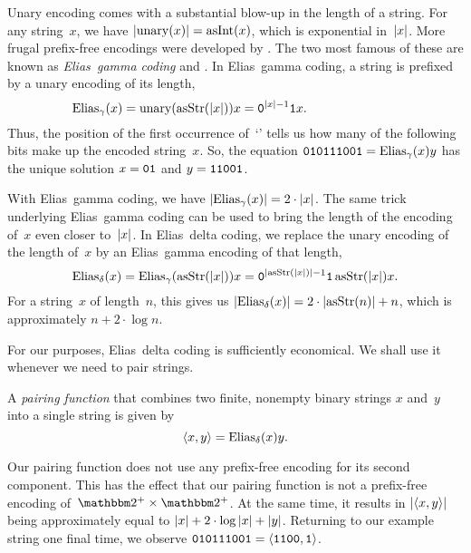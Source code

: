 Unary encoding comes with a substantial blow-up in the length of a string.
For any string~$x$, we have ${\lvert\operatorname{unary}(x)\rvert} = \operatorname{asInt}(x)$, which is exponential in~${\lvert x\rvert}$.
More frugal prefix-free encodings were developed by \textcite{elias1975universal}.
The two most famous of these are known as \emph{Elias~gamma coding} and  \parencite[see also][]{sayood2017introduction}.
In Elias~gamma coding, a string is prefixed by a unary encoding of its length,
\begin{equation*}
  \mathrlap{
    \Elias_\gamma(x) \deq \unary(\asStr(\length{x})) x = \bits{0}^{\length{x} - 1} \bits{1} x.
  }\phantom{
    \Elias_\delta(x) \deq \Elias_\gamma(\asStr(\length{x})) x = \bits{0}^{\length{\asStr(\length{x})} - 1} \bits{1} \asStr(\length{x}) x.
  }
\end{equation*}
Thus, the position of the first occurrence of~`' tells us how many of the following bits make up the encoded string~$x$.
So, the equation $\textnormal{\texttt{010111001}} = \operatorname{Elias}_\gamma(x)y$ has the unique solution $x = \textnormal{\texttt{01}}$ and $y = \textnormal{\texttt{11001}}$.

With Elias~gamma coding, we have ${\lvert\operatorname{Elias}_\gamma(x)\rvert} = 2 \cdot {\lvert x\rvert}$.
The same trick underlying Elias~gamma coding can be used to bring the length of the encoding of~$x$ even closer to~${\lvert x\rvert}$.
In Elias~delta coding, we replace the unary encoding of the length of~$x$ by an Elias~gamma encoding of that length,
\begin{equation*}
  \operatorname{Elias}_\delta(x) = \operatorname{Elias}_\gamma(\operatorname{asStr}({\lvert x\rvert})) x = \textnormal{\texttt{0}}^{{\lvert\operatorname{asStr}({\lvert x\rvert})\rvert} - 1} \textnormal{\texttt{1}} \operatorname{asStr}({\lvert x\rvert}) x.
\end{equation*}
For a string~$x$ of length~$n$, this gives us ${\lvert\operatorname{Elias}_\delta(x)\rvert} = 2 \cdot {\lvert\operatorname{asStr}(n)\rvert} + n$, which is approximately $n + 2 \cdot \log n$.

For our purposes, Elias~delta coding is sufficiently economical.
We shall use it whenever we need to pair strings.
\begin{definition}
  A \emph{pairing function} that combines two finite, nonempty binary strings $x$ and~$y$ into a single string is given by
  \begin{equation*}
    {\langle x, y\rangle} = \operatorname{Elias}_\delta(x)y.
  \end{equation*}
\end{definition}

Our pairing function does not use any prefix-free encoding for its second component.
This has the effect that our pairing function is not a prefix-free encoding of~$\binary^+ \times \binary^+$.
At the same time, it results in ${\lvert{\langle x, y\rangle}\rvert}$ being approximately equal to ${\lvert x\rvert} + 2 \cdot \log {\lvert x\rvert} + {\lvert y\rvert}$.
Returning to our example string one final time, we observe $\textnormal{\texttt{010111001}} = {\langle \textnormal{\texttt{1100}}, \textnormal{\texttt{1}}\rangle}$.

